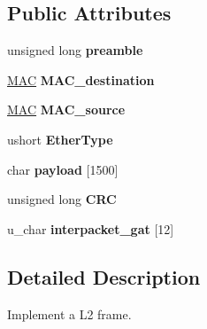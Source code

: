 \subsection*{Public Attributes}
\begin{DoxyCompactItemize}
\item 
unsigned long {\bfseries preamble}\hypertarget{structlink_1_1Frame_a560843e736beacb7e8dec851f4ee1f9e}{}\label{structlink_1_1Frame_a560843e736beacb7e8dec851f4ee1f9e}

\item 
\hyperlink{structMAC}{M\+AC} {\bfseries M\+A\+C\+\_\+destination}\hypertarget{structlink_1_1Frame_aa85e5728d6dfab309546d55c74a5def3}{}\label{structlink_1_1Frame_aa85e5728d6dfab309546d55c74a5def3}

\item 
\hyperlink{structMAC}{M\+AC} {\bfseries M\+A\+C\+\_\+source}\hypertarget{structlink_1_1Frame_a972ec99e9747b045143f6d7c6f4e0bd3}{}\label{structlink_1_1Frame_a972ec99e9747b045143f6d7c6f4e0bd3}

\item 
ushort {\bfseries Ether\+Type}\hypertarget{structlink_1_1Frame_a6ae867ac5cf3d8949d0a8ed72683e14d}{}\label{structlink_1_1Frame_a6ae867ac5cf3d8949d0a8ed72683e14d}

\item 
char {\bfseries payload} \mbox{[}1500\mbox{]}\hypertarget{structlink_1_1Frame_a0aca61f4762da429483aff778ec9f01f}{}\label{structlink_1_1Frame_a0aca61f4762da429483aff778ec9f01f}

\item 
unsigned long {\bfseries C\+RC}\hypertarget{structlink_1_1Frame_abeaa6f98cfe999333b31926b6caf5d84}{}\label{structlink_1_1Frame_abeaa6f98cfe999333b31926b6caf5d84}

\item 
u\+\_\+char {\bfseries interpacket\+\_\+gat} \mbox{[}12\mbox{]}\hypertarget{structlink_1_1Frame_a949962d7ee45bbcf1787640c797e5bf8}{}\label{structlink_1_1Frame_a949962d7ee45bbcf1787640c797e5bf8}

\end{DoxyCompactItemize}


\subsection{Detailed Description}
Implement a L2 frame. 

